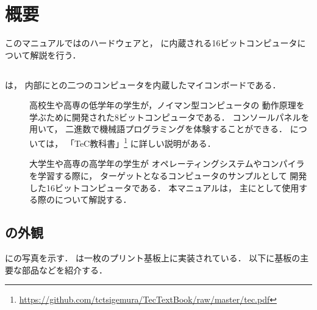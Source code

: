 \chapter{概要}
このマニュアルでは{\tecS}のハードウェアと，
{\tecS}に内蔵される16ビットコンピュータ{\tac}について解説を行う．

\section{\tecS}
\tecS は，
内部に{\tec}と{\tac}の二つのコンピュータを内蔵したマイコンボードである．

\begin{description}
\item[\tec]
  高校生や高専の低学年の学生が，ノイマン型コンピュータの
  動作原理を学ぶために開発された8ビットコンピュータである．
  コンソールパネルを用いて，
  二進数で機械語プログラミングを体験することができる．
  {\tec}については，
  「TeC教科書」\footnote{
    \url{https://github.com/tctsigemura/TecTextBook/raw/master/tec.pdf}}
  に詳しい説明がある．
\item[\tac]
  大学生や高専の高学年の学生が
  オペレーティングシステムやコンパイラを学習する際に，
  ターゲットとなるコンピュータのサンプルとして
  開発した16ビットコンピュータである．
  本マニュアルは，
  主に{\tac}として使用する際の{\tecS}について解説する．
\end{description}

\section{{\tecS}の外観}

に{\tecS}の写真を示す．
{\tecS}は一枚のプリント基板上に実装されている．
以下に基板の主要な部品などを紹介する．


